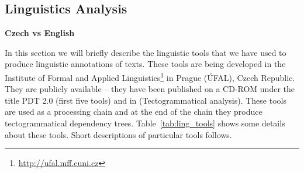 \subsection{Linguistics Analysis} \label{sec:ch30_ling_tools}

\textbf{Czech vs English}

In this section we will briefly describe the linguistic tools that we have used to produce linguistic annotations of texts. These tools are being developed in the Institute of Formal and Applied Linguistics\footnote{\url{http://ufal.mff.cuni.cz}} in Prague (ÚFAL), Czech Republic. They are publicly available -- they have been published on a CD-ROM under the title PDT 2.0 \citep{biblio:PDT20_CD} (first five tools) and in \citep{biblio:KlTransformationBasedTectogrammatical2006} (Tectogrammatical analysis). These tools are used as a processing chain and at the end of the chain they produce tectogrammatical \citep{biblio:MiBeAnnotationtectogrammatical2006} dependency trees. Table~\ref{tab:ling_tools} shows some details about these tools. Short descriptions of particular tools follows.


